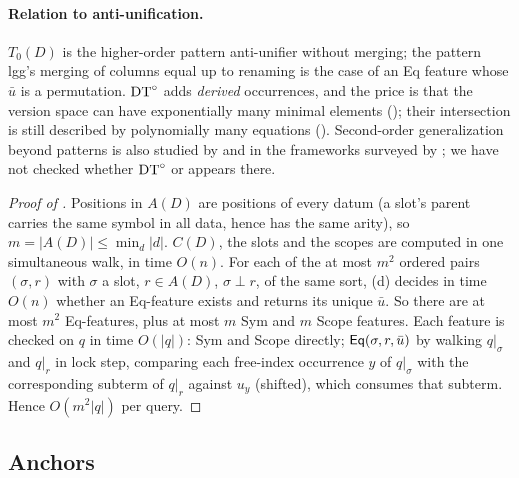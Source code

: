\paragraph{Relation to anti-unification.} $T_0(D)$ is the higher-order pattern anti-unifier without merging; the pattern lgg's merging of columns equal up to renaming \citep{pfenning1991unification,baumgartner2017higher} is the case of an Eq feature whose $\bar u$ is a permutation. $\mathrm{DT}^{\circ}$ adds \emph{derived} occurrences, and the price is that the version space can have exponentially many minimal elements (); their intersection is still described by polynomially many equations (). Second-order generalization beyond patterns is also studied by \citet{hirata2004generalization} and in the frameworks surveyed by \citet{cerna2023antiunification}; we have not checked whether $\mathrm{DT}^{\circ}$ or  appears there.

\begin{proof}[Proof of ]
Positions in $A(D)$ are positions of every datum (a slot's parent carries the same symbol in all data, hence has the same arity), so $m=|A(D)|\le\min_d|d|$. $C(D)$, the slots and the scopes are computed in one simultaneous walk, in time $O(n)$. For each of the at most $m^2$ ordered pairs $(\sigma,r)$ with $\sigma$ a slot, $r\in A(D)$, $\sigma\perp r$, of the same sort, (d) decides in time $O(n)$ whether an Eq-feature exists and returns its unique $\bar u$. So there are at most $m^2$ Eq-features, plus at most $m$ Sym and $m$ Scope features. Each feature is checked on $q$ in time $O(|q|)$: Sym and Scope directly; $\mathsf{Eq}(\sigma,r,\bar u)$ by walking $q|_\sigma$ and $q|_r$ in lock step, comparing each free-index occurrence $y$ of $q|_\sigma$ with the corresponding subterm of $q|_r$ against $u_y$ (shifted), which consumes that subterm. Hence $O(m^2|q|)$ per query.
\end{proof}

\subsection{Anchors}\label{app:single:anchor}

